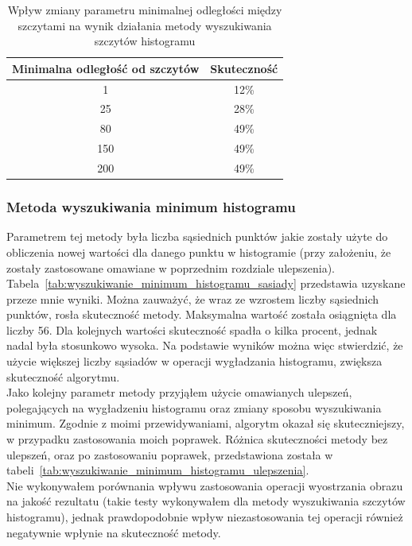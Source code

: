 \begin {table}
  \begin{center}
    \begin{tabular}{c | c}
      Minimalna odległość od szczytów & Skuteczność \\
      \hline
      1 & 12\% \\
      25 & 28\% \\
      80 & 49\% \\
      150 & 49\% \\
      200 & 49\%
    \end{tabular}
    \caption {Wpływ zmiany parametru minimalnej odległości między szczytami na wynik działania metody wyszukiwania szczytów histogramu}
    \label{tab:wyszukiwanie_szczytow_dystans} 
  \end{center}
\end {table}

\subsubsection{Metoda wyszukiwania minimum histogramu}
Parametrem tej metody była liczba sąsiednich punktów jakie zostały użyte do obliczenia nowej wartości dla danego punktu w histogramie (przy założeniu, że zostały zastosowane omawiane w poprzednim rozdziale ulepszenia). Tabela~\ref{tab:wyszukiwanie_minimum_histogramu_sasiady} przedstawia uzyskane przeze mnie wyniki. Można zauważyć, że wraz ze wzrostem liczby sąsiednich punktów, rosła skuteczność metody. Maksymalna wartość została osiągnięta dla liczby 56. Dla kolejnych wartości skuteczność spadła o kilka procent, jednak nadal była stosunkowo wysoka. Na podstawie wyników można więc stwierdzić, że użycie większej liczby sąsiadów w operacji wygładzania histogramu, zwiększa skuteczność algorytmu. \\
Jako kolejny parametr metody przyjąłem użycie omawianych ulepszeń, polegających na wygładzeniu histogramu oraz zmiany sposobu wyszukiwania minimum. Zgodnie z moimi przewidywaniami, algorytm okazał się skuteczniejszy, w przypadku zastosowania moich poprawek. Różnica skuteczności metody bez ulepszeń, oraz po zastosowaniu poprawek, przedstawiona została w tabeli~\ref{tab:wyszukiwanie_minimum_histogramu_ulepszenia}. \\
Nie wykonywałem porównania wpływu zastosowania operacji wyostrzania obrazu na jakość rezultatu (takie testy wykonywałem dla metody wyszukiwania szczytów histogramu), jednak prawdopodobnie wpływ niezastosowania tej operacji również negatywnie wpłynie na skuteczność metody.


